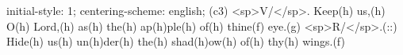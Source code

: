 initial-style: 1;
centering-scheme: english;
(c3) <sp>V/</sp>. Keep(h) us,(h) O(h) Lord,(h) as(h) the(h) ap(h)ple(h) of(h) thine(f) eye.(g) <sp>R/</sp>.(::) 
Hide(h) us(h) un(h)der(h) the(h) shad(h)ow(h) of(h) thy(h) wings.(f)
